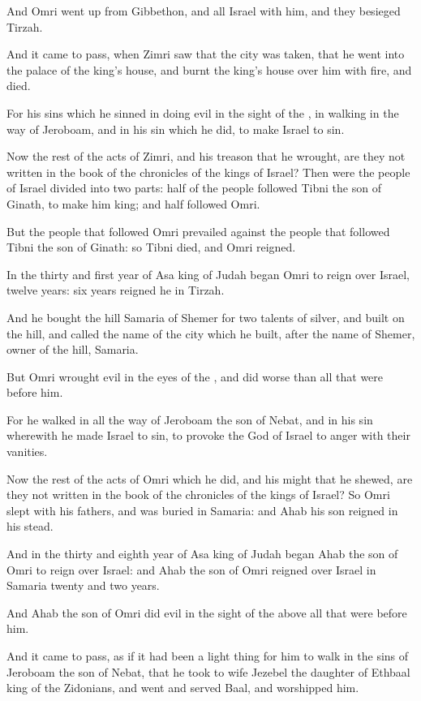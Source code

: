 \Verse And Omri went up from Gibbethon, and all Israel with him, and they besieged Tirzah.

\Verse And it came to pass, when Zimri saw that the city was taken, that he went into the palace of the king's house, and burnt the king's house over him with fire, and died.

\Verse For his sins which he sinned in doing evil in the sight of the \LORD, in walking in the way of Jeroboam, and in his sin which he did, to make Israel to sin.

\Verse Now the rest of the acts of Zimri, and his treason that he wrought, are they not written in the book of the chronicles of the kings of Israel?  \Verse Then were the people of Israel divided into two parts: half of the people followed Tibni the son of Ginath, to make him king; and half followed Omri.

\Verse But the people that followed Omri prevailed against the people that followed Tibni the son of Ginath: so Tibni died, and Omri reigned.

\Verse In the thirty and first year of Asa king of Judah began Omri to reign over Israel, twelve years: six years reigned he in Tirzah.

\Verse And he bought the hill Samaria of Shemer for two talents of silver, and built on the hill, and called the name of the city which he built, after the name of Shemer, owner of the hill, Samaria.

\Verse But Omri wrought evil in the eyes of the \LORD, and did worse than all that were before him.

\Verse For he walked in all the way of Jeroboam the son of Nebat, and in his sin wherewith he made Israel to sin, to provoke the \LORD God of Israel to anger with their vanities.

\Verse Now the rest of the acts of Omri which he did, and his might that he shewed, are they not written in the book of the chronicles of the kings of Israel?  \Verse So Omri slept with his fathers, and was buried in Samaria: and Ahab his son reigned in his stead.

\Verse And in the thirty and eighth year of Asa king of Judah began Ahab the son of Omri to reign over Israel: and Ahab the son of Omri reigned over Israel in Samaria twenty and two years.

\Verse And Ahab the son of Omri did evil in the sight of the \LORD above all that were before him.

\Verse And it came to pass, as if it had been a light thing for him to walk in the sins of Jeroboam the son of Nebat, that he took to wife Jezebel the daughter of Ethbaal king of the Zidonians, and went and served Baal, and worshipped him.

